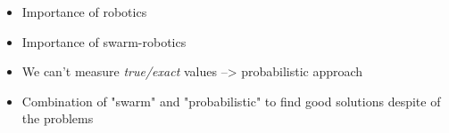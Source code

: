 \begin{itemize}
	\item{Importance of robotics}
	\item{Importance of swarm-robotics}
	\item{We can't measure \emph{true/exact} values --> probabilistic approach}
	\item{Combination of "swarm" and "probabilistic" to find good solutions despite of the problems}
\end{itemize}

